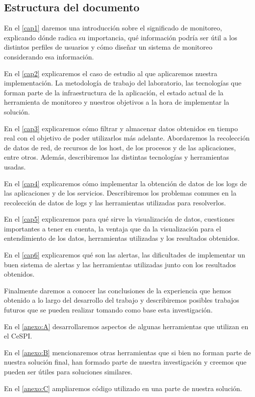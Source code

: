 \subsection{Estructura del documento}
\label{estructura}

En el \autoref{cap1} daremos una introducción sobre el significado de monitoreo, explicando dónde radica su importancia, qué información podría ser útil a los distintos perfiles de usuarios y cómo diseñar un sistema de monitoreo considerando esa información.

En el \autoref{cap2} explicaremos el caso de estudio al que aplicaremos nuestra implementación. La metodología de trabajo del laboratorio, las tecnologías que forman parte de la infraestructura de la aplicación, el estado actual de la herramienta de monitoreo y nuestros objetivos a la hora de implementar la solución.

En el \autoref{cap3} explicaremos cómo filtrar y almacenar datos obtenidos en tiempo real con el objetivo de poder utilizarlos más adelante. Abordaremos la recolección de datos de red, de recursos de los host, de los procesos y de las aplicaciones, entre otros. Además, describiremos las distintas tecnologías y herramientas usadas.

En el \autoref{cap4} explicaremos cómo implementar la obtención de datos de los logs de las aplicaciones y de los servicios. Describiremos los problemas comunes en la recolección de datos de logs y las herramientas utilizadas para resolverlos.

En el \autoref{cap5} explicaremos para qué sirve la visualización de datos, cuestiones importantes a tener en cuenta, la ventaja que da la visualización para el entendimiento de los datos, herramientas utilizadas y los resultados obtenidos.

En el \autoref{cap6} explicaremos qué son las alertas, las dificultades de implementar un buen sistema de alertas y las herramientas utilizadas junto con los resultados obtenidos.

Finalmente daremos a conocer las conclusiones de la experiencia que hemos obtenido a lo largo del desarrollo del trabajo y describiremos posibles trabajos futuros que se pueden realizar tomando como base esta investigación.

En el \autoref{anexo:A} desarrollaremos aspectos de algunas herramientas que utilizan en el CeSPI.

En el \autoref{anexo:B} mencionaremos otras herramientas que si bien no forman parte de nuestra solución final, han formado parte de nuestra investigación y creemos que pueden ser útiles para soluciones similares. 

En el \autoref{anexo:C} ampliaremos código utilizado en una parte de nuestra solución.
